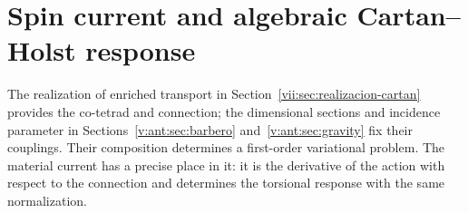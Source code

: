 %

\section{Spin current and algebraic Cartan--Holst response}
\label{vii:sec:corriente-respuesta-cartan}

The realization of enriched transport in
Section~\ref{vii:sec:realizacion-cartan} provides the co-tetrad and
connection; the dimensional sections and incidence parameter in
Sections~\ref{v:ant:sec:barbero} and~\ref{v:ant:sec:gravity} fix their couplings. Their composition
determines a first-order variational problem. The material current
has a precise place in it: it is the derivative of the action with respect
to the connection and determines the torsional response with the same normalization.

